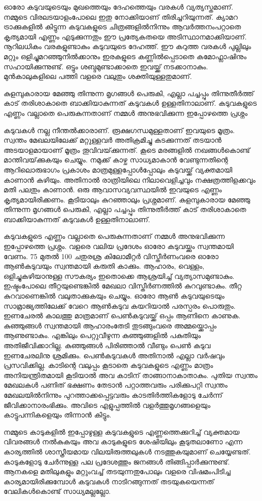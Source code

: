 \documentclass[
    11pt,
    a4paper
]{article}
\begin{document}
ഓരോ കടുവയുടെയും മുഖത്തെയും ദേഹത്തെയും വരകൾ വ്യത്യസ്തമാണ്. നമ്മുടെ വിരലടയാളംപോലെ ഇതു നോക്കിയാണ്  തിരിച്ചറിയുന്നത്. ക്യാമറ ട്രാക്കുകളിൽ കിട്ടുന്ന കടുവകളുടെ ചിത്രങ്ങളിൽനിന്നും ആവർത്തനംപറ്റാതെ കൃത്യമായി എണ്ണം എടുക്കുന്നതും ഈ പ്രത്യേകതയെ അടിസ്ഥാനമാക്കിയാണ്.  നൂറിലധികം വരകളുണ്ടാകും കടുവയുടെ ദേഹത്ത്. ഈ കറുത്ത വരകൾ പുല്ലിലും മറ്റും ഒളിച്ചുമറഞ്ഞുനിൽക്കാനും ഇരകളുടെ കണ്ണിൽപ്പെടാതെ കമോഫ്ലാഷിനും സഹായിക്കുന്നുണ്ട്.  ഒട്ടും ശബ്ദമുണ്ടാക്കാതെ ഇവയ്ക്ക് നടക്കാനാകും. മുൻകാലുകളിലെ പത്തി വളരെ വലുതും ശക്തിയുള്ളതുമാണ്.

കുളമ്പുകാരായ മേഞ്ഞു തിന്നുന്ന മൃഗങ്ങൾ പെരുകി, എല്ലാ പച്ചപ്പും തിന്നുതീർത്ത് കാട് തരിശാകാതെ ബാക്കിയാകുന്നത് കടുവകൾ ഉള്ളതിനാലാണ്. കടുവകളുടെ എണ്ണം വല്ലാതെ പെരുകുന്നതാണ് നമ്മൾ അനുഭവിക്കുന്ന ഇപ്പോഴത്തെ പ്രശ്നം

കടുവകൾ നല്ല നീന്തൽക്കാരാണ്. രൂക്ഷഗന്ധമുള്ളതാണ് ഇവയുടെ മൂത്രം. സ്വന്തം മേഖലയിലേക്ക് മറ്റുള്ളവർ അതിക്രമിച്ചു കടക്കുന്നത് തടയാൻ അടയാളമായാണ് മൂത്രം തൂവിവയ്‌ക്കുന്നത്. കൂടെ മരങ്ങളിൽ നഖങ്ങൾകൊണ്ട് മാന്തിവയ്‌ക്കുകയും ചെയ്യും. നമുക്ക് കാഴ്ച സാധ്യമാകാൻ വേണ്ടുന്നതിന്റെ ആറിലൊരുഭാഗം പ്രകാശം മാത്രമുള്ളപ്പോൾപ്പോലും കടുവയ്ക്ക് വ്യക്തമായി കാണാൻ കഴിയും. അതിനാൽ രാത്രിയിലെ നിലാവെളിച്ചവും നക്ഷത്രത്തിളക്കവും മതി പലതും കാണാൻ. ഒരു ആവാസവ്യവസ്ഥയിൽ ഇവയുടെ എണ്ണം കൃത്യമായിരിക്കണം.  കൂടിയാലും കുറഞ്ഞാലും പ്രശ്നമാണ്. കുളമ്പുകാരായ മേഞ്ഞു തിന്നുന്ന മൃഗങ്ങൾ പെരുകി, എല്ലാ പച്ചപ്പും തിന്നുതീർത്ത് കാട് തരിശാകാതെ ബാക്കിയാകുന്നത് കടുവകൾ ഉള്ളതിനാലാണ്.

കടുവകളുടെ എണ്ണം വല്ലാതെ പെരുകുന്നതാണ് നമ്മൾ അനുഭവിക്കുന്ന ഇപ്പോഴത്തെ പ്രശ്നം. വളരെ വലിയ പ്രദേശം ഓരോ കടുവയ്ക്കും സ്വന്തമായി വേണം. 75 മുതൽ 100 ചതുരശ്ര കിലോമീറ്റർ വിസ്തീർണംവരെ ഓരോ ആൺകടുവയും  സ്വന്തമായി കരുതി കാക്കും. ആഹാരം, വെള്ളം, ഒളിച്ചുകഴിയാനുള്ള സൗകര്യം ഇതൊക്കെ ആശ്രയിച്ച് വ്യത്യാസമുണ്ടാകും. ഇഷ്ടംപോലെ തീറ്റയുണ്ടെങ്കിൽ മേഖലാ വിസ്തീർണത്തിൽ കുറവുണ്ടാകും. തീറ്റ കുറവാണെങ്കിൽ വലുതാക്കുകയും ചെയ്യും. ഓരോ ആൺ  കടുവയുടെയും സാമ്രാജ്യത്തിലേക്ക് വേറെ ആൺകടുവ കയറിയാൽ പരസ്പരം പൊരുതും.  ഇണചേരൽ കാലത്തു മാത്രമാണ് പെൺകടുവയ്ക്ക് ഒപ്പം ആണിനെ കാണുക. കുഞ്ഞുങ്ങൾ സ്വന്തമായി ആഹാരംതേടി തുടങ്ങുംവരെ അമ്മയ്ക്കൊപ്പം ആണുണ്ടാകും. എങ്കിലും പെറ്റുവീഴുന്ന കുഞ്ഞുങ്ങളിൽ പകുതിയും അതിജീവിക്കാറില്ല.  കുഞ്ഞുങ്ങൾ പിരിഞ്ഞാൽ വീണ്ടും പെൺ കടുവ ഇണചേരലിനു ശ്രമിക്കും.  പെൺകടുവകൾ അതിനാൽ  എല്ലാ വർഷവും പ്രസവിക്കില്ല.  കാടിന്റെ വലുപ്പം കൂടാതെ കടുവകളുടെ എണ്ണം മാത്രം അനിയന്ത്രിതമായി കൂടിയാൽ അവ കാടിന് താങ്ങാനാകാതാകും. പുതിയ സ്വന്തം മേഖലകൾ  പണിത് ഭക്ഷണം തേടാൻ പറ്റാത്തവരും പരിക്കുപറ്റി സ്വന്തം മേഖലയിൽനിന്നും പുറത്താക്കപ്പെട്ടവരും കാടതിർത്തികളോടു ചേർന്ന് ജീവിക്കാനാരംഭിക്കും. അവിടെ  എളുപ്പത്തിൽ വളർത്തുമൃഗങ്ങളെയും കാട്ടുപന്നികളെയും  തിന്നാൻ  കിട്ടും.

നമ്മുടെ കാടുകളിൽ ഇപ്പോഴുള്ള കടുവകളുടെ എണ്ണത്തെക്കുറിച്ച് വ്യക്തമായ വിവരങ്ങൾ നൽകുകയും അവ കാടുകളുടെ ശേഷിയിലും കൂടുതലാണോ എന്ന കാര്യത്തിൽ ശാസ്ത്രീയമായ വിലയിരുത്തലുകൾ നടത്തുകയുമാണ് ചെയ്യേണ്ടത്.  കാടുകളോടു ചേർന്നുള്ള പല പ്രദേശത്തും  ജനങ്ങൾ തിങ്ങിപ്പാർക്കുന്നുണ്ട്. ആനകളെ മതിലുകളും മറ്റുംവച്ച് തടയുന്നതുപോലും വളരെ വിഷമംപിടിച്ച കാര്യമായിരിക്കുമ്പോൾ കടുവകൾ നാടിറങ്ങുന്നത് തടയുകയെന്നത് വേലികൾകൊണ്ട് സാധ്യമല്ലല്ലോ.
\end{document}
